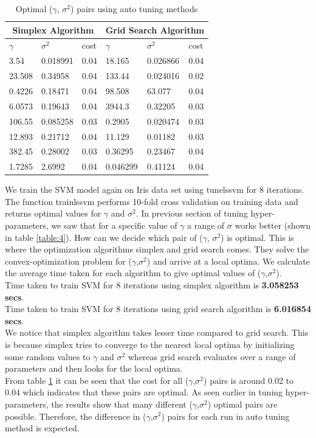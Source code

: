 {\begin{table}
	\begin{tabular}{ |p{1.5cm}|p{1.5cm}|p{1.5cm}||p{1.5cm}|p{1.5cm}|p{1.5cm}| }
		\hline
		\multicolumn{3}{|c|}{Simplex Algorithm} &\multicolumn{3}{|c|}{Grid Search Algorithm}
\\ \hline	
	\cellcolor{blue!25}$\gamma$ &\cellcolor{blue!25}$\sigma^2$ & \cellcolor{blue!25}cost & \cellcolor{blue!25}$\gamma$ &\cellcolor{blue!25}$\sigma^2$ &\cellcolor{blue!25}cost \\ \hline
	 3.54 &0.018991 &0.04 &18.165  &0.026866 &0.04 \\ \hline
	23.508 &0.34958 &0.04 &133.44  &0.024016 &0.02 \\ \hline
	0.4226 &0.18471 &0.04 &98.508  &63.077   &0.04 \\ \hline
	6.0573 &0.19643 &0.04 &3944.3  &0.32205  &0.03 \\ \hline
	106.55 &0.085258 &0.03 &0.2905 &0.020474 &0.03 \\ \hline
	12.893 &0.21712 &0.04 &11.129  &0.01182  &0.03 \\ \hline
	382.45 &0.28002 &0.03 &0.36295 &0.23467  &0.04 \\ \hline
	1.7285 &2.6992 &0.04 &0.046299 &0.41124  &0.04 \\ \hline
	\end{tabular}
	\caption{Optimal ($\gamma$, $\sigma^2$) pairs using auto tuning methods}
	\label{table:5}
\end{table}

We train the SVM model again on Iris data set using tunelssvm for 8 iterations. The function trainlssvm performs 10-fold cross validation on training data and returns optimal values for $\gamma$ and $\sigma^2$. In previous section of tuning hyper-parameters, we saw that for a specific value of $\gamma$ a range of $\sigma$ works better (shown in table \ref{table:4}). How can we decide which pair of ($\gamma$, $\sigma^2$) is optimal. This is where the optimization algorithms simplex and grid search comes. They solve the convex-optimization problem for ($\gamma$,$\sigma^2$) and arrive at a local optima. We calculate the average time taken for each algorithm to give optimal values of ($\gamma$,$\sigma^2$). \\
Time taken to train SVM for 8 iterations using simplex algorithm is {\bf 3.058253 secs}.\\
Time taken to train SVM for 8 iterations using grid search algorithm is {\bf 6.016854 secs}.\\
We notice that simplex algorithm takes lesser time compared to grid search. This is because simplex tries to converge to the nearest local optima by initializing some random values to $\gamma$ and $\sigma^2$ whereas grid search evaluates over a range of parameters and then looks for the local optima.\\
From table \ref{table:5} it can be seen that the cost for all ($\gamma$,$\sigma^2$) pairs is around 0.02 to 0.04 which indicates that these pairs are optimal. As seen earlier in tuning hyper-parameters, the results show that many different ($\gamma$,$\sigma^2$) optimal pairs are possible. Therefore, the difference in ($\gamma$,$\sigma^2$) pairs for each run in auto tuning method is expected. 
}
